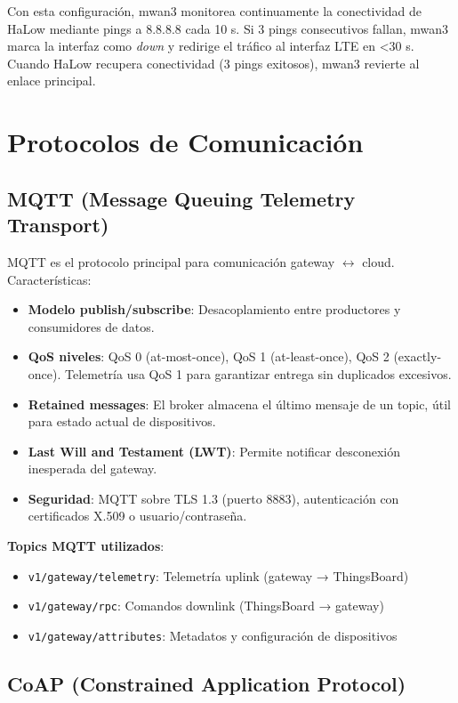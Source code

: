 Con esta configuración, mwan3 monitorea continuamente la conectividad de HaLow mediante pings a 8.8.8.8 cada 10 s. Si 3 pings consecutivos fallan, mwan3 marca la interfaz como \textit{down} y redirige el tráfico al interfaz LTE en <30 s. Cuando HaLow recupera conectividad (3 pings exitosos), mwan3 revierte al enlace principal.

\section{Protocolos de Comunicación}

\subsection{MQTT (Message Queuing Telemetry Transport)}

MQTT es el protocolo principal para comunicación gateway $\leftrightarrow$ cloud. Características:

\begin{itemize}
    \item \textbf{Modelo publish/subscribe}: Desacoplamiento entre productores y consumidores de datos.
    \item \textbf{QoS niveles}: QoS 0 (at-most-once), QoS 1 (at-least-once), QoS 2 (exactly-once). Telemetría usa QoS 1 para garantizar entrega sin duplicados excesivos.
    \item \textbf{Retained messages}: El broker almacena el último mensaje de un topic, útil para estado actual de dispositivos.
    \item \textbf{Last Will and Testament (LWT)}: Permite notificar desconexión inesperada del gateway.
    \item \textbf{Seguridad}: MQTT sobre TLS 1.3 (puerto 8883), autenticación con certificados X.509 o usuario/contraseña.
\end{itemize}

\textbf{Topics MQTT utilizados}:
\begin{itemize}
    \item \texttt{v1/gateway/telemetry}: Telemetría uplink (gateway → ThingsBoard)
    \item \texttt{v1/gateway/rpc}: Comandos downlink (ThingsBoard → gateway)
    \item \texttt{v1/gateway/attributes}: Metadatos y configuración de dispositivos
\end{itemize}

\subsection{CoAP (Constrained Application Protocol)}

